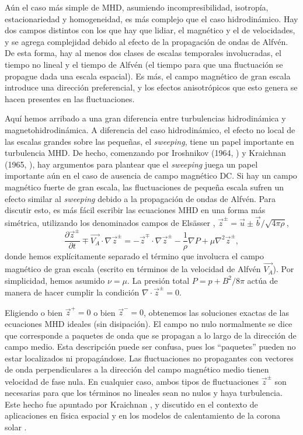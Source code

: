 Aún el caso más simple de MHD, asumiendo incompresibilidad, isotropía,
estacionariedad y homogeneidad, es más complejo que el caso
hidrodinámico. Hay dos campos distintos con los que hay que lidiar, el
magnético y el de velocidades, y se agrega complejidad debido al
efecto de la propagación de ondas de Alfv\'en. De esta forma, hay al
menos dos clases de escalas temporales involucradas, el tiempo no
lineal y el tiempo de Alfv\'en (el tiempo para que una fluctuación se
propague dada una escala espacial). Es más, el campo magnético de gran
escala introduce una dirección preferencial, y los efectos
anisotrópicos que esto genera se hacen presentes en las fluctuaciones.

Aquí hemos arribado a una gran diferencia entre turbulencias
hidrodinámica y magnetohidrodinámica. A diferencia del caso
hidrodinámico, el efecto no local de las escalas grandes sobre las
pequeñas, el \textit{sweeping}, tiene un papel importante en
turbulencia MHD. De hecho, comenzando por Iroshnikov (1964,
\cite{iroshnikov_turbulence_1964}) y Kraichnan (1965,
\cite{kraichnan_inertial-range_1965}), hay argumentos para plantear
que el \textit{sweeping} juega un papel importante aún en el caso de
ausencia de campo magnético DC. Si hay un campo magnético fuerte de
gran escala, las fluctuaciones de pequeña escala sufren un efecto
similar al \textit{sweeping} debido a la propagación de ondas de
Alfv\'en. Para discutir esto, es más fácil escribir las ecuaciones MHD
en una forma más simétrica, utilizando los denominados campos de
Els\"asser \cite{elsasser_hydromagnetism_1956}, $\vec{z}^\pm = \vec{u}
\pm \vec{b}/\sqrt{4\pi\rho}$,
\begin{equation}\label{eq:MHDElsasser}
  \frac{\partial \vec{z}^\pm}{\partial t} \mp \vec{V_A} \cdot \nabla\vec{z}^\pm = -\vec{z}^\mp \cdot \nabla\vec{z}^\pm - \frac{1}{\rho} \nabla P + \mu \nabla^2 \vec{z}^\pm,
\end{equation}
donde hemos explícitamente separado el término que involucra el campo
magnético de gran escala (escrito en términos de la velocidad de
Alfv\'en $\vec{V_A}$). Por simplicidad, hemos asumido $\nu = \mu$. La
presión total $P = p + B^2/8\pi$ actúa de manera de hacer cumplir la
condición $\nabla\cdot\vec{z}^\pm = 0$.

Eligiendo o bien $\vec{z}^+ = 0$ o bien $\vec{z}^- = 0$, obtenemos las
soluciones exactas de las ecuaciones MHD ideales (sin disipación). El
campo no nulo normalmente se dice que corresponde a paquetes de onda
que se propagan a lo largo de la dirección de campo medio. Esta
descripción puede ser confusa, pues los ``paquetes'' pueden no estar
localizados ni propagándose. Las fluctuaciones no propagantes con
vectores de onda perpendiculares a la dirección del campo magnético
medio tienen velocidad de fase nula. En cualquier caso, ambos tipos de
fluctuaciones $\vec{z}^\pm$ son necesarias para que los términos no
lineales sean no nulos y haya turbulencia. Este hecho fue apuntado por
Kraichnan \cite{kraichnan_inertial-range_1965}, y discutido en el
contexto de aplicaciones en física espacial
\cite{dobrowolny_fully_1980} y en los modelos de calentamiento de la
corona solar \cite{dmitruk_conditions_2001}.

